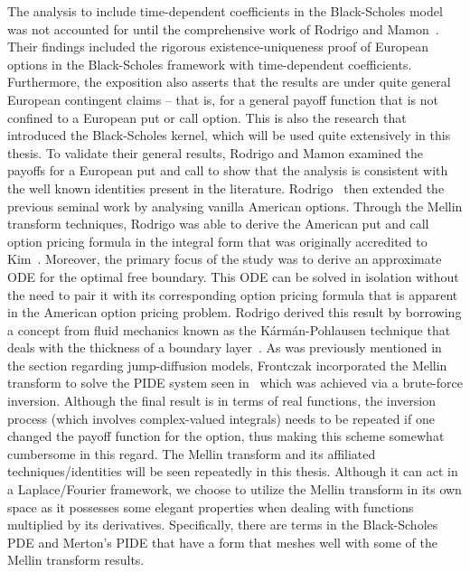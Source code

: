 		The analysis to include time-dependent coefficients in the Black-Scholes model was not accounted for until the comprehensive work of Rodrigo and Mamon~\cite{Rodrigo2006}. Their findings included the rigorous existence-uniqueness proof of European options in the Black-Scholes framework with time-dependent coefficients. Furthermore, the exposition also asserts that the results are under quite general European contingent claims -- that is, for a general payoff function that is not confined to a European put or call option. This is also the research that introduced the Black-Scholes kernel, which will be used quite extensively in this thesis. To validate their general results, Rodrigo and Mamon examined the payoffs for a European put and call to show that the analysis is consistent with the well known identities present in the literature. Rodrigo~\cite{Rodrigo2013} then extended the previous seminal work by analysing vanilla American options. Through the Mellin transform techniques, Rodrigo was able to derive the American put and call option pricing formula in the integral form that was originally accredited to Kim~\cite{Kim1990}. Moreover, the primary focus of the study was to derive an approximate ODE for the optimal free boundary. This ODE can be solved in isolation without the need to pair it with its corresponding option pricing formula that is apparent in the American option pricing problem. Rodrigo derived this result by borrowing a concept from fluid mechanics known as the K\'arm\'an-Pohlausen technique that deals with the thickness of a boundary layer~\cite[pp. 421--423]{Zwillinger1998}. As was previously mentioned in the section regarding jump-diffusion models, Frontczak \cite{Frontczak2013} incorporated the Mellin transform to solve the PIDE system seen in~\cite{Merton1976} which was achieved via a brute-force inversion. Although the final result is in terms of real functions, the inversion process (which involves complex-valued integrals) needs to be repeated if one changed the payoff function for the option, thus making this scheme somewhat cumbersome in this regard.
		The Mellin transform and its affiliated techniques/identities will be seen repeatedly in this thesis. Although it can act in a Laplace/Fourier framework, we choose to utilize the Mellin transform in its own space as it possesses some elegant properties when dealing with functions multiplied by its derivatives. Specifically, there are terms in the Black-Scholes PDE and Merton's PIDE that have a form that meshes well with some of the Mellin transform results.
		
